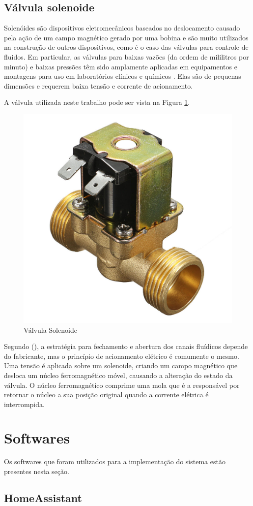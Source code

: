 \subsection{Válvula solenoide}

Solenóides são dispositivos eletromecânicos baseados no deslocamento causado pela ação de um campo magnético gerado por uma bobina e são muito utilizados na construção de outros dispositivos, como é o caso das válvulas para controle de fluidos. Em particular, as válvulas para baixas vazões (da ordem de mililitros por minuto) e baixas pressões têm sido amplamente aplicadas em equipamentos e montagens para uso em laboratórios clínicos e químicos  \cite{da2002modulo}. Elas são de pequenas dimensões e requerem baixa tensão e corrente de acionamento.

A válvula utilizada neste trabalho pode ser vista na Figura \ref{fig:valvula-solenoide}.

\begin{figure}[htbp]
	\centering
	\includegraphics[width=0.3\linewidth]{figuras/valvula-solenoide.jpg}
	\caption{Válvula Solenoide}
	\label{fig:valvula-solenoide}
\end{figure}

Segundo \citeauthor{da2002modulo} (\citeyear{da2002modulo}), a estratégia para fechamento e abertura dos canais fluídicos depende do fabricante, mas o princípio de acionamento elétrico é comumente o mesmo. Uma tensão é aplicada sobre um solenoide, criando um campo magnético que desloca um núcleo ferromagnético móvel, causando a alteração do estado da válvula. O núcleo
ferromagnético comprime uma mola que é a responsável por retornar o núcleo a sua posição original quando a corrente elétrica é interrompida.

\section{Softwares}

Os softwares que foram utilizados para a implementação do sistema estão presentes nesta seção.

\subsection{HomeAssistant}


